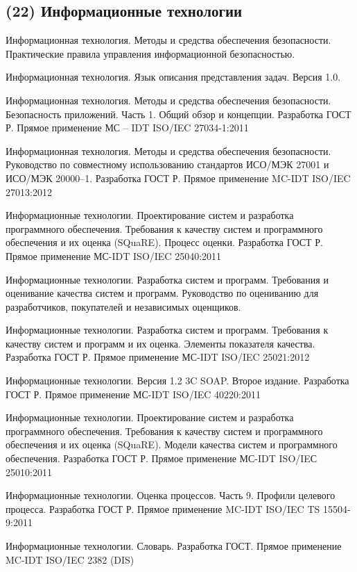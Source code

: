 \subsection{(22) Информационные технологии}

Информационная технология. Методы и средства обеспечения безопасности. Практические правила управления информационной безопасностью.

Информационная технология. Язык описания представления задач. Версия 1.0.

Информационная технология. Методы и средства обеспечения безопасности. Безопасность приложений. Часть 1. Общий обзор и концепции. Разработка ГОСТ Р. Прямое применение МС – IDT ISO/IEC 27034-1:2011

Информационная технология. Методы и средства обеспечения безопасности. Руководство по совместному использованию стандартов ИСО/МЭК 27001 и ИСО/МЭК 20000–1. Разработка ГОСТ Р. Прямое применение MC-IDT ISO/IEC 27013:2012

Информационные технологии. Проектирование систем и разработка программного обеспечения. Требования к качеству систем и программного обеспечения и их оценка (SQuaRE). Процесс оценки. Разработка ГОСТ Р. Прямое применение МС-IDT ISO/IEC 25040:2011

Информационные технологии. Разработка систем и программ. Требования и оценивание качества систем и программ. Руководство по оцениванию для разработчиков, покупателей и независимых оценщиков.

Информационные технологии. Разработка систем и программ. Требования к качеству систем и программ и их оценка. Элементы показателя качества. Разработка ГОСТ Р. Прямое применение МС-IDT ISO/IEC 25021:2012

Информационные технологии. Версия 1.2 3C SOAP. Второе издание. Разработка ГОСТ Р. Прямое применение МС-IDT ISO/IEC 40220:2011

Информационные технологии. Проектирование систем и разработка программного обеспечения. Требования к качеству систем и программного обеспечения и их оценка (SQuaRE). Модели качества систем и программного обеспечения. Разработка ГОСТ Р.  Прямое применение МС-IDT ISO/IEС 25010:2011

Информационные технологии. Оценка процессов. Часть 9. Профили целевого процесса. Разработка ГОСТ Р. Прямое применение MC-IDT ISO/IEC TS 15504-9:2011

Информационные технологии. Словарь. Разработка ГОСТ. Прямое применение MC-IDT ISO/IEC 2382 (DIS)


